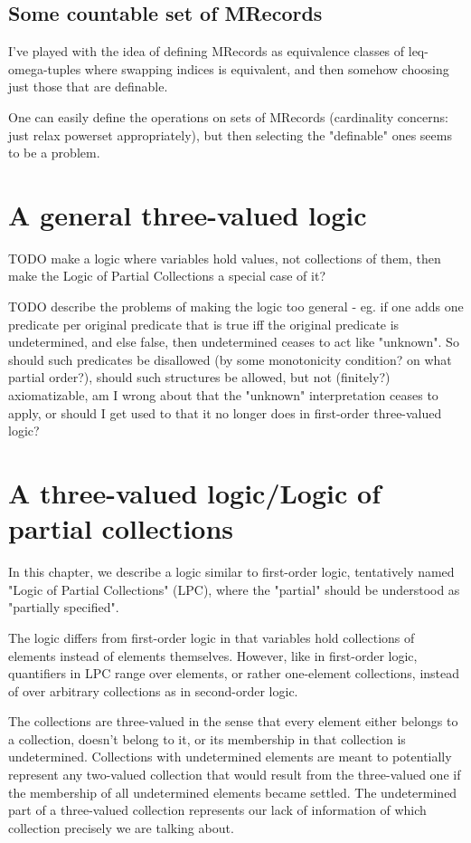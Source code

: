 \documentclass[oneside,12pt]{book}
\theoremstyle{definition}
\theoremstyle{remark}
\begin{document}
\section{Some countable set of MRecords}
I've played with the idea of defining MRecords as equivalence classes of
leq-omega-tuples where swapping indices is equivalent, and then somehow
choosing just those that are definable.

One can easily define the operations on sets of MRecords (cardinality concerns:
just relax powerset appropriately), but then selecting the "definable" ones
seems to be a problem.


\chapter{A general three-valued logic}
TODO make a logic where variables hold values, not collections of them,
then make the Logic of Partial Collections a special case of it?

TODO describe the problems of making the logic too general - eg. if one adds one predicate
per original predicate that is true iff the original predicate is undetermined,
and else false, then undetermined ceases to act like "unknown". So should
such predicates be disallowed (by some monotonicity condition? on what partial order?),
should such structures be allowed, but not (finitely?) axiomatizable, am I wrong about
that the "unknown" interpretation ceases to apply, or should I get used to that it no
longer does in first-order three-valued logic?

\chapter{A three-valued logic/Logic of partial collections}
In this chapter, we describe a logic similar to first-order logic, tentatively named
"Logic of Partial Collections" (LPC), where the "partial" should be understood
as "partially specified".

The logic differs from first-order logic in that variables hold collections
of elements instead of elements themselves. However, like in first-order logic,
quantifiers in LPC range over elements, or rather one-element collections,
instead of over arbitrary collections as in second-order logic.

The collections are three-valued in the sense that every element either belongs
to a collection, doesn't belong to it, or its membership in that collection is
undetermined. Collections with undetermined elements are meant to potentially represent
any two-valued collection that would result from the three-valued one if the
membership of all undetermined elements became settled. The undetermined part
of a three-valued collection represents our lack of information of which collection
precisely we are talking about.
\end{document}
